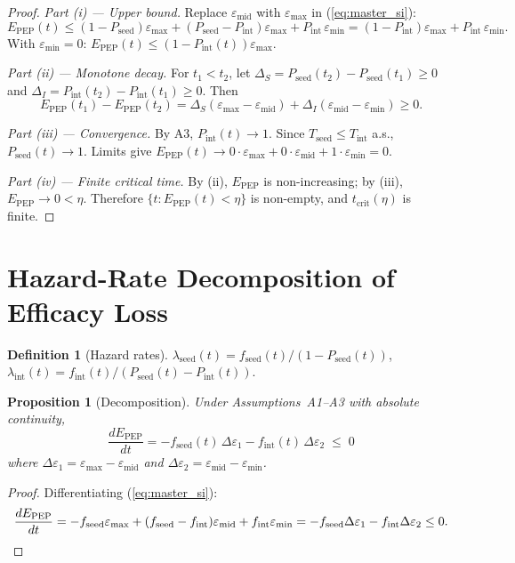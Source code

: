 \documentclass[11pt]{article}
\newtheorem{proposition}{Proposition}[section]
\theoremstyle{definition}
\newtheorem{definition}{Definition}[section]
\theoremstyle{remark}
\newcommand{\Tseed}{T_{\text{seed}}}
\newcommand{\Tint}{T_{\text{int}}}
\newcommand{\Pseed}{P_{\text{seed}}}
\newcommand{\Pint}{P_{\text{int}}}
\newcommand{\Epep}{E_{\text{PEP}}}
\newcommand{\tcrit}{t_{\text{crit}}}
\newcommand{\emax}{\varepsilon_{\max}}
\newcommand{\emid}{\varepsilon_{\text{mid}}}
\newcommand{\emin}{\varepsilon_{\min}}
\begin{document}
\begin{proof}
\textit{Part (i) --- Upper bound.} Replace $\emid$ with $\emax$ in (\ref{eq:master_si}):
\[
\Epep(t) \leq (1 - \Pseed)\emax + (\Pseed - \Pint)\emax + \Pint\,\emin = (1 - \Pint)\emax + \Pint\,\emin.
\]
With $\emin = 0$: $\Epep(t) \leq (1 - \Pint(t))\emax$.

\textit{Part (ii) --- Monotone decay.} For $t_{1} < t_{2}$, let $\Delta_{S} = \Pseed(t_{2}) - \Pseed(t_{1}) \geq 0$ and $\Delta_{I} = \Pint(t_{2}) - \Pint(t_{1}) \geq 0$. Then
\[
\Epep(t_{1}) - \Epep(t_{2}) = \Delta_{S}(\emax - \emid) + \Delta_{I}(\emid - \emin) \geq 0.
\]

\textit{Part (iii) --- Convergence.} By A3, $\Pint(t) \to 1$. Since $\Tseed \leq \Tint$ a.s., $\Pseed(t) \to 1$. Limits give $\Epep(t) \to 0\cdot\emax + 0\cdot\emid + 1\cdot\emin = 0$.

\textit{Part (iv) --- Finite critical time.} By (ii), $\Epep$ is non-increasing; by (iii), $\Epep \to 0 < \eta$. Therefore $\{t : \Epep(t) < \eta\}$ is non-empty, and $\tcrit(\eta)$ is finite.
\end{proof}


\section{Hazard-Rate Decomposition of Efficacy Loss}

\begin{definition}[Hazard rates]
$\lambda_{\text{seed}}(t) = f_{\text{seed}}(t)/(1 - \Pseed(t))$, $\lambda_{\text{int}}(t) = f_{\text{int}}(t)/(\Pseed(t) - \Pint(t))$.
\end{definition}

\begin{proposition}[Decomposition]\label{prop:hazard}
Under Assumptions~A1--A3 with absolute continuity,
\begin{equation}
\frac{d\Epep}{dt} = -f_{\text{seed}}(t)\,\Delta\varepsilon_{1} - f_{\text{int}}(t)\,\Delta\varepsilon_{2} \;\leq\; 0
\label{eq:hazard_si}
\end{equation}
where $\Delta\varepsilon_{1} = \emax - \emid$ and $\Delta\varepsilon_{2} = \emid - \emin$.
\end{proposition}

\begin{proof}
Differentiating (\ref{eq:master_si}):
\[
\frac{d\Epep}{dt} = -f_{\text{seed}}\emax + (f_{\text{seed}} - f_{\text{int}})\emid + f_{\text{int}}\emin = -f_{\text{seed}}\Delta\varepsilon_{1} - f_{\text{int}}\Delta\varepsilon_{2} \leq 0. \qedhere
\]
\end{proof}
\end{document}
